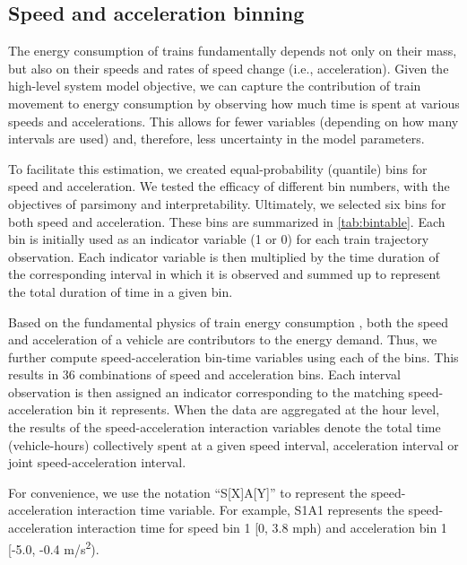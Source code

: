 \documentclass[times]{TRR}
\begin{document}
\subsection{Speed and acceleration binning}
The energy consumption of trains fundamentally depends not only on their mass, but also on their speeds and rates of speed change (i.e., acceleration). Given the high-level system model objective, we can capture the contribution of train movement to energy consumption by observing how much time is spent at various speeds and accelerations. This allows for fewer variables (depending on how many intervals are used) and, therefore, less uncertainty in the model parameters.

To facilitate this estimation, we created equal-probability (quantile) bins for speed and acceleration.  We tested the efficacy of different bin numbers, with the objectives of parsimony and interpretability. Ultimately, we selected six bins for both speed and acceleration. These bins are summarized  in \autoref{tab:bintable}. Each bin is initially used as an indicator variable (1 or 0) for each train trajectory observation. Each indicator variable is then multiplied by the time duration of the corresponding interval in which it is observed and summed up to represent the total duration of time in a given bin. 

Based on the fundamental physics of train energy consumption \cite{wang2017electric}, both the speed and acceleration of a vehicle are contributors to the energy demand. Thus, we further compute speed-acceleration bin-time variables using each of the bins. This results in 36 combinations of speed and acceleration bins. Each interval observation is then assigned an indicator corresponding to the matching speed-acceleration bin it represents. When the data are aggregated at the hour level, the results of the speed-acceleration interaction variables denote the total time (vehicle-hours) collectively spent at a given speed interval, acceleration interval or joint speed-acceleration interval. 

For convenience, we use the notation “S[X]A[Y]” to represent the speed-acceleration interaction time variable. For example, S1A1 represents the speed-acceleration interaction time for speed bin 1 [0, 3.8 mph) and acceleration bin 1 [-5.0, -0.4 m/s\textsuperscript{2}). 
\end{document}
